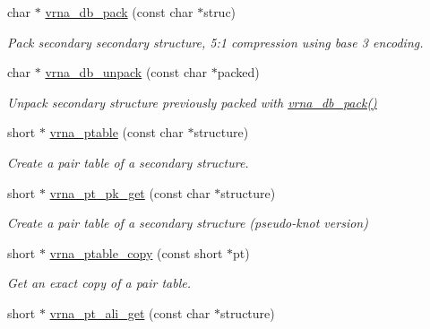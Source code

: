 \begin{DoxyCompactItemize}
char $\ast$ \hyperlink{group__struct__utils_ga55c4783060a1464f862f858d5599c9e1}{vrna\+\_\+db\+\_\+pack} (const char $\ast$struc)
\begin{DoxyCompactList}\small\item\em Pack secondary secondary structure, 5\+:1 compression using base 3 encoding. \end{DoxyCompactList}\item 
char $\ast$ \hyperlink{group__struct__utils_ga6490adff857d84ce06e6f379ae3a4512}{vrna\+\_\+db\+\_\+unpack} (const char $\ast$packed)
\begin{DoxyCompactList}\small\item\em Unpack secondary structure previously packed with \hyperlink{group__struct__utils_ga55c4783060a1464f862f858d5599c9e1}{vrna\+\_\+db\+\_\+pack()} \end{DoxyCompactList}\item 
short $\ast$ \hyperlink{group__struct__utils_gae829fb8bb7f694c12a9c0bbc34c77c60}{vrna\+\_\+ptable} (const char $\ast$structure)
\begin{DoxyCompactList}\small\item\em Create a pair table of a secondary structure. \end{DoxyCompactList}\item 
short $\ast$ \hyperlink{group__struct__utils_gacca520048b24ec5a8978f4dafb4e4bf8}{vrna\+\_\+pt\+\_\+pk\+\_\+get} (const char $\ast$structure)
\begin{DoxyCompactList}\small\item\em Create a pair table of a secondary structure (pseudo-\/knot version) \end{DoxyCompactList}\item 
short $\ast$ \hyperlink{group__struct__utils_ga2daefbbd6d9f8803731651882f54332d}{vrna\+\_\+ptable\+\_\+copy} (const short $\ast$pt)
\begin{DoxyCompactList}\small\item\em Get an exact copy of a pair table. \end{DoxyCompactList}\item 
\hypertarget{group__struct__utils_ga1ee4cdcda1f57d32dcb38032116d335d}{}short $\ast$ \hyperlink{group__struct__utils_ga1ee4cdcda1f57d32dcb38032116d335d}{vrna\+\_\+pt\+\_\+ali\+\_\+get} (const char $\ast$structure)\label{group__struct__utils_ga1ee4cdcda1f57d32dcb38032116d335d}


\end{DoxyCompactItemize}
